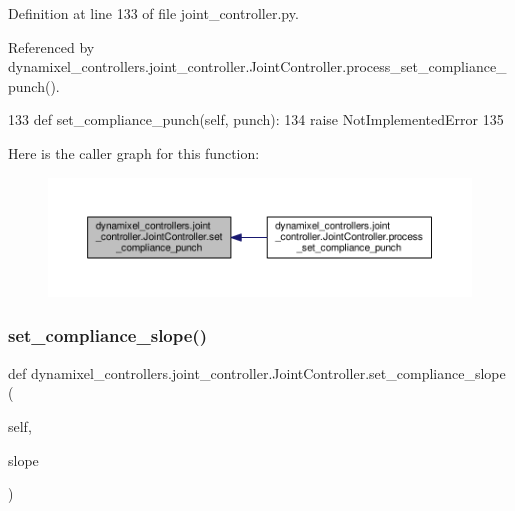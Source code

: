 Definition at line 133 of file joint\+\_\+controller.\+py.



Referenced by dynamixel\+\_\+controllers.\+joint\+\_\+controller.\+Joint\+Controller.\+process\+\_\+set\+\_\+compliance\+\_\+punch().


\begin{DoxyCode}
133     \textcolor{keyword}{def }set\_compliance\_punch(self, punch):
134         \textcolor{keywordflow}{raise} NotImplementedError
135 
\end{DoxyCode}
Here is the caller graph for this function\+:
\nopagebreak
\begin{figure}[H]
\begin{center}
\leavevmode
\includegraphics[width=350pt]{d3/dcd/classdynamixel__controllers_1_1joint__controller_1_1_joint_controller_a3d62f11f16ce860e39dfbfaa2b598a5b_icgraph}
\end{center}
\end{figure}
\mbox{\label{classdynamixel__controllers_1_1joint__controller_1_1_joint_controller_a72508504f90f51b689d256d0dd3fc87b}} 
\subsubsection{\texorpdfstring{set\+\_\+compliance\+\_\+slope()}{set\_compliance\_slope()}}
{\footnotesize\ttfamily def dynamixel\+\_\+controllers.\+joint\+\_\+controller.\+Joint\+Controller.\+set\+\_\+compliance\+\_\+slope (\begin{DoxyParamCaption}\item[{}]{self,  }\item[{}]{slope }\end{DoxyParamCaption})}



